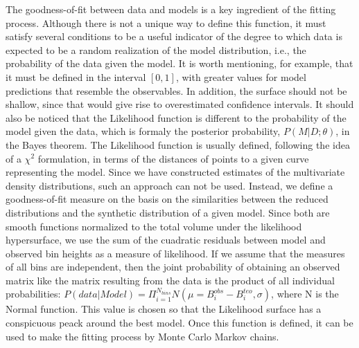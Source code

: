\documentclass[11pt,twoside
]{article}
\begin{document}
The goodness-of-fit between data and models is a key ingredient of the
fitting process. Although there is not a unique way to define this
function, it must satisfy several conditions to be a useful indicator
of the degree to which data is expected to be a random realization of
the model distribution, i.e., the probability of the data given the
model.  It is worth mentioning, for example, that it must be defined
in the interval $[0, 1]$, with greater values for model predictions
that resemble the observables. In addition, the surface should not be
shallow, since that would give rise to overestimated confidence
intervals. It should also be noticed that the Likelihood function is
different to the probability of the model given the data, which is
formaly the posterior probability, $P (M |D; \theta)$, in the Bayes
theorem.  The Likelihood function is usually defined, following the
idea of a $\chi^2$ formulation, in terms of the distances of points to
a given curve representing the model. Since we have constructed
estimates of the multivariate density distributions, such an approach
can not be used.  Instead, we define a goodness-of-fit measure on the
basis on the similarities between the reduced distributions and the
synthetic distribution of a given model. Since both are smooth
functions normalized to the total volume under the likelihood
hypersurface, we use the sum of the cuadratic residuals between model and observed bin
heights as a measure of likelihood. If we assume that the measures of
all bins are independent, then the joint probability of obtaining an
observed matrix like the matrix resulting from the data is the product
of all individual probabilities:
%
$P(data|Model) = \Pi_{i=1}^{N_{bins}} N(\mu=B_i^{obs} - B_i^{teo},
\sigma)$,
%
where N is the Normal function. This value is chosen so that the
Likelihood surface has a conspicuous peack around the best model.
Once this function is defined, it can be used to make the fitting
process by Monte Carlo Markov chains.


\end{document}
